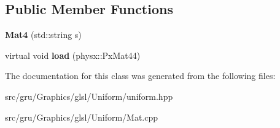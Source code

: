 \subsection*{\-Public \-Member \-Functions}
\begin{DoxyCompactItemize}
\item 
\hypertarget{classglutpp_1_1glsl_1_1Uniform_1_1Scalar_1_1Mat4_aed783354e0bd2c20887cd84e9b6d3380}{{\bfseries \-Mat4} (std\-::string s)}\label{classglutpp_1_1glsl_1_1Uniform_1_1Scalar_1_1Mat4_aed783354e0bd2c20887cd84e9b6d3380}

\item 
\hypertarget{classglutpp_1_1glsl_1_1Uniform_1_1Scalar_1_1Mat4_ad3cf1854c3520a78d5650352574a51d2}{virtual void {\bfseries load} (physx\-::\-Px\-Mat44)}\label{classglutpp_1_1glsl_1_1Uniform_1_1Scalar_1_1Mat4_ad3cf1854c3520a78d5650352574a51d2}

\end{DoxyCompactItemize}


\-The documentation for this class was generated from the following files\-:\begin{DoxyCompactItemize}
\item 
src/gru/\-Graphics/glsl/\-Uniform/uniform.\-hpp\item 
src/gru/\-Graphics/glsl/\-Uniform/\-Mat.\-cpp\end{DoxyCompactItemize}
